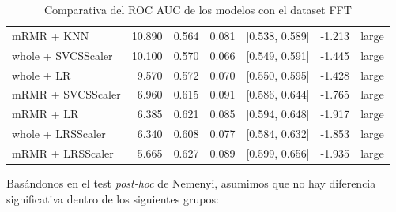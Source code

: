 \documentclass[a4paper,oneside,11pt,leqno]{article}
\begin{document}
\begin{table}[h]
\begin{tabular}{lrrrlll}
			mRMR + KNN         & 10.890 & 0.564 & 0.081 &  [0.538, 0.589] & -1.213 &       large \\
			whole + SVCSScaler & 10.100 & 0.570 & 0.066 &  [0.549, 0.591] & -1.445 &       large \\
			whole + LR         &  9.570 & 0.572 & 0.070 &  [0.550, 0.595] & -1.428 &       large \\
			mRMR + SVCSScaler  &  6.960 & 0.615 & 0.091 &  [0.586, 0.644] & -1.765 &       large \\
			mRMR + LR          &  6.385 & 0.621 & 0.085 &  [0.594, 0.648] & -1.917 &       large \\
			whole + LRSScaler  &  6.340 & 0.608 & 0.077 &  [0.584, 0.632] & -1.853 &       large \\
			mRMR + LRSScaler   &  5.665 & 0.627 & 0.089 &  [0.599, 0.656] & -1.935 &       large \\
			\bottomrule
		\end{tabular}
		\caption{Comparativa del ROC AUC de los modelos con el dataset FFT}
		\label{tab:stat_results_fft}
	\end{table}

	Basándonos en el test \textit{post-hoc} de Nemenyi, asumimos que no hay diferencia significativa dentro de los siguientes grupos:
\end{document}
